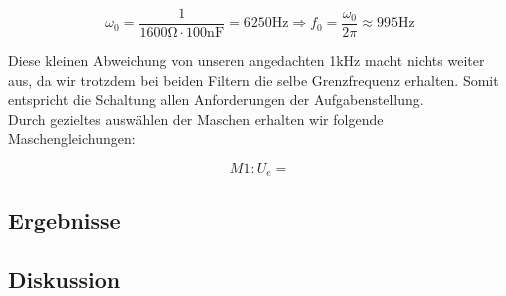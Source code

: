 $$\omega_{0}=\frac{1}{1600\si{\ohm}\cdot 100\si{\nano\farad}}=6250\si{\hertz}\Rightarrow f_{0}=\frac{\omega_{0}}{2\pi}\approx 995\si{\hertz}$$

Diese kleinen Abweichung von unseren angedachten 1\si{\kilo\hertz} macht nichts weiter aus, da wir trotzdem bei beiden Filtern die selbe Grenzfrequenz erhalten.
Somit entspricht die Schaltung allen Anforderungen der Aufgabenstellung.\\
Durch gezieltes auswählen der Maschen erhalten wir folgende Maschengleichungen:

$$M1:U_{e}=$$


\subsection{Ergebnisse}

\subsection{Diskussion}


